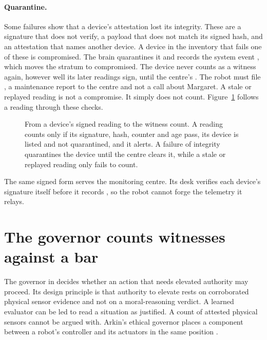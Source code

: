 \paragraph{Quarantine.} Some failures show that a device's attestation lost its integrity. These are a
signature that does not verify, a payload that does not match its signed hash, and an attestation
that names another device. A device in the inventory that fails one of these is compromised. The
brain quarantines it and records the system event , which moves the
 stratum to compromised. The device never counts as a witness again, however
well its later readings sign, until the centre's . The robot must file
, a maintenance report to the centre and not a call about Margaret. A stale or
replayed reading is not a compromise. It simply does not count. Figure~\ref{fig:attestation} follows
a reading through these checks.

\begin{figure}[t]
\centering

\caption{From a device's signed reading to the witness count. A reading counts only if its signature,
hash, counter and age pass, its device is listed and not quarantined, and it alerts. A failure of
integrity quarantines the device until the centre clears it, while a stale or replayed reading only
fails to count.}
\label{fig:attestation}
\end{figure}

The same signed form serves the monitoring centre. Its desk verifies each device's signature itself
before it records , so the robot cannot forge the telemetry it relays.

\section{The governor counts witnesses against a bar}\label{sec:cont-governor}

The governor in  decides whether an action that needs elevated authority may
proceed. Its design principle is that authority to elevate rests on corroborated physical sensor
evidence and not on a moral-reasoning verdict. A learned evaluator can be led to read a situation as
justified. A count of attested physical sensors cannot be argued with. Arkin's ethical governor
places a component between a robot's controller and its actuators in the same position
\cite{arkin2009governing}.

